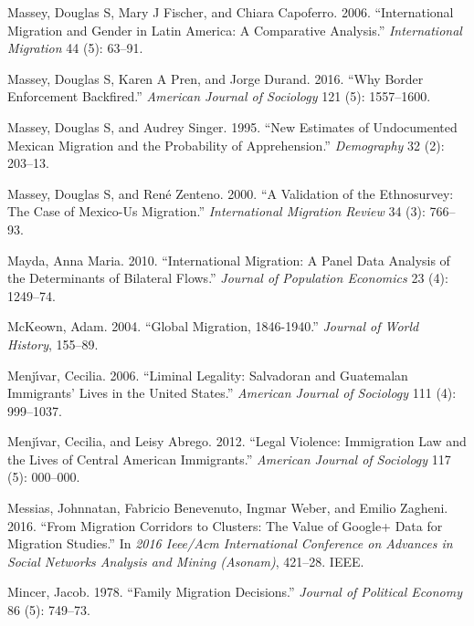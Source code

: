 \documentclass[
]{article}
\begin{document}
\leavevmode\hypertarget{ref-massey2006international}{}%
Massey, Douglas S, Mary J Fischer, and Chiara Capoferro. 2006.
``International Migration and Gender in Latin America: A Comparative
Analysis.'' \emph{International Migration} 44 (5): 63--91.

\leavevmode\hypertarget{ref-massey2016border}{}%
Massey, Douglas S, Karen A Pren, and Jorge Durand. 2016. ``Why Border
Enforcement Backfired.'' \emph{American Journal of Sociology} 121 (5):
1557--1600.

\leavevmode\hypertarget{ref-massey1995new}{}%
Massey, Douglas S, and Audrey Singer. 1995. ``New Estimates of
Undocumented Mexican Migration and the Probability of Apprehension.''
\emph{Demography} 32 (2): 203--13.

\leavevmode\hypertarget{ref-massey2000validation}{}%
Massey, Douglas S, and René Zenteno. 2000. ``A Validation of the
Ethnosurvey: The Case of Mexico-Us Migration.'' \emph{International
Migration Review} 34 (3): 766--93.

\leavevmode\hypertarget{ref-mayda2010international}{}%
Mayda, Anna Maria. 2010. ``International Migration: A Panel Data
Analysis of the Determinants of Bilateral Flows.'' \emph{Journal of
Population Economics} 23 (4): 1249--74.

\leavevmode\hypertarget{ref-mckeown2004global}{}%
McKeown, Adam. 2004. ``Global Migration, 1846-1940.'' \emph{Journal of
World History}, 155--89.

\leavevmode\hypertarget{ref-menjivar2006liminal}{}%
Menjı́var, Cecilia. 2006. ``Liminal Legality: Salvadoran and Guatemalan
Immigrants' Lives in the United States.'' \emph{American Journal of
Sociology} 111 (4): 999--1037.

\leavevmode\hypertarget{ref-menjivar2012legal}{}%
Menjı́var, Cecilia, and Leisy Abrego. 2012. ``Legal Violence: Immigration
Law and the Lives of Central American Immigrants.'' \emph{American
Journal of Sociology} 117 (5): 000--000.

\leavevmode\hypertarget{ref-messias2016migration}{}%
Messias, Johnnatan, Fabricio Benevenuto, Ingmar Weber, and Emilio
Zagheni. 2016. ``From Migration Corridors to Clusters: The Value of
Google+ Data for Migration Studies.'' In \emph{2016 Ieee/Acm
International Conference on Advances in Social Networks Analysis and
Mining (Asonam)}, 421--28. IEEE.

\leavevmode\hypertarget{ref-mincer1978family}{}%
Mincer, Jacob. 1978. ``Family Migration Decisions.'' \emph{Journal of
Political Economy} 86 (5): 749--73.
\end{document}
